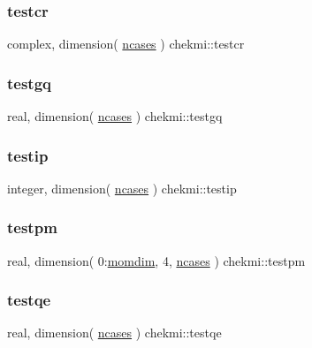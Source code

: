 \subsubsection{\texorpdfstring{testcr}{testcr}}
{\footnotesize\ttfamily complex, dimension( \hyperlink{namespacechekmi_a7a072a81d4a96e7c6d537baf67910952}{ncases} ) chekmi\+::testcr}

\mbox{\label{namespacechekmi_ae461e282eac8b7dd5dffffde9e1cdfcd}} 
\subsubsection{\texorpdfstring{testgq}{testgq}}
{\footnotesize\ttfamily real, dimension( \hyperlink{namespacechekmi_a7a072a81d4a96e7c6d537baf67910952}{ncases} ) chekmi\+::testgq}

\mbox{\label{namespacechekmi_ab52396a3ffb179abce8f932e43f228f8}} 
\subsubsection{\texorpdfstring{testip}{testip}}
{\footnotesize\ttfamily integer, dimension( \hyperlink{namespacechekmi_a7a072a81d4a96e7c6d537baf67910952}{ncases} ) chekmi\+::testip}

\mbox{\label{namespacechekmi_a3157f6abe6c10bee0ff0e67a35621556}} 
\subsubsection{\texorpdfstring{testpm}{testpm}}
{\footnotesize\ttfamily real, dimension( 0\+:\hyperlink{namespacechekmi_afe35bc0756f5ff0b6d6c0d0e65db8548}{momdim}, 4, \hyperlink{namespacechekmi_a7a072a81d4a96e7c6d537baf67910952}{ncases} ) chekmi\+::testpm}

\mbox{\label{namespacechekmi_aee69cac91029367099c7c9e4aa151153}} 
\subsubsection{\texorpdfstring{testqe}{testqe}}
{\footnotesize\ttfamily real, dimension( \hyperlink{namespacechekmi_a7a072a81d4a96e7c6d537baf67910952}{ncases} ) chekmi\+::testqe}

